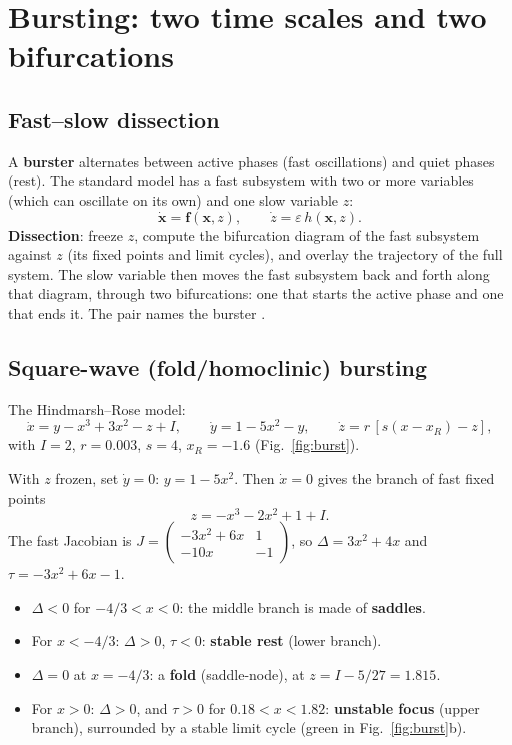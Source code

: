 \documentclass[11pt,openany]{report}
\newcommand{\eps}{\varepsilon}
\begin{document}
\chapter{Bursting: two time scales and two bifurcations}
\section{Fast--slow dissection}
A \textbf{burster} alternates between active phases (fast oscillations) and quiet phases (rest). The standard model has
a fast subsystem with two or more variables (which can oscillate on its own) and one slow variable $z$:
\[
\dot{\mathbf x} = \mathbf f(\mathbf x, z),\qquad \dot z = \eps\, h(\mathbf x, z).
\]
\textbf{Dissection}: freeze $z$, compute the bifurcation diagram of the fast subsystem against $z$ (its fixed points and
limit cycles), and overlay the trajectory of the full system. The slow variable then moves the fast subsystem back and
forth along that diagram, through two bifurcations: one that starts the active phase and one that ends it. The pair
names the burster \cite{izhikevich}.

\section{Square-wave (fold/homoclinic) bursting}
The Hindmarsh--Rose model:
\[
\dot x = y - x^3 + 3x^2 - z + I,\qquad \dot y = 1 - 5x^2 - y,\qquad \dot z = r\,[s(x - x_R) - z],
\]
with $I=2$, $r=0.003$, $s=4$, $x_R=-1.6$ (Fig.~\ref{fig:burst}).

\begin{worked}
With $z$ frozen, set $\dot y = 0$: $y = 1 - 5x^2$. Then $\dot x = 0$ gives the branch of fast fixed points
\[
z = -x^3 - 2x^2 + 1 + I .
\]
The fast Jacobian is $J = \begin{pmatrix} -3x^2 + 6x & 1\\ -10x & -1\end{pmatrix}$, so $\Delta = 3x^2 + 4x$ and
$\tau = -3x^2 + 6x - 1$.
\begin{itemize}
\item $\Delta < 0$ for $-4/3 < x < 0$: the middle branch is made of \textbf{saddles}.
\item For $x<-4/3$: $\Delta>0$, $\tau<0$: \textbf{stable rest} (lower branch).
\item $\Delta = 0$ at $x = -4/3$: a \textbf{fold} (saddle-node), at $z = I - 5/27 = 1.815$.
\item For $x>0$: $\Delta > 0$, and $\tau>0$ for $0.18<x<1.82$: \textbf{unstable focus} (upper branch), surrounded by a
stable limit cycle (green in Fig.~\ref{fig:burst}b).
\end{itemize}
\end{worked}
\end{document}
